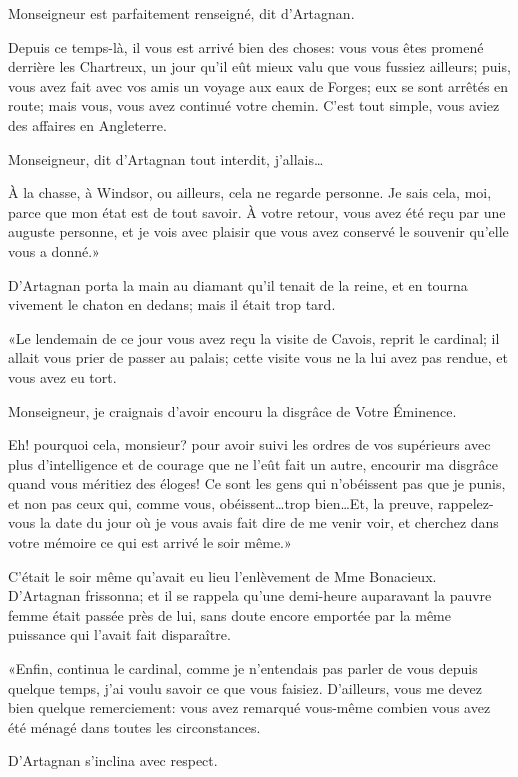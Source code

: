 \speak  Monseigneur est parfaitement renseigné, dit d'Artagnan. 

Depuis ce temps-là, il vous est arrivé bien des choses: vous vous êtes promené derrière les Chartreux, un jour qu'il eût mieux valu que vous fussiez ailleurs; puis, vous avez fait avec vos amis un voyage aux eaux de Forges; eux se sont arrêtés en route; mais vous, vous avez continué votre chemin. C'est tout simple, vous aviez des affaires en Angleterre. 

\speak  Monseigneur, dit d'Artagnan tout interdit, j'allais\dots 

\speak  À la chasse, à Windsor, ou ailleurs, cela ne regarde personne. Je sais cela, moi, parce que mon état est de tout savoir. À votre retour, vous avez été reçu par une auguste personne, et je vois avec plaisir que vous avez conservé le souvenir qu'elle vous a donné.» 

\speak  D'Artagnan porta la main au diamant qu'il tenait de la reine, et en tourna vivement le chaton en dedans; mais il était trop tard. 

«Le lendemain de ce jour vous avez reçu la visite de Cavois, reprit le cardinal; il allait vous prier de passer au palais; cette visite vous ne la lui avez pas rendue, et vous avez eu tort. 

\speak  Monseigneur, je craignais d'avoir encouru la disgrâce de Votre Éminence. 

\speak  Eh! pourquoi cela, monsieur? pour avoir suivi les ordres de vos supérieurs avec plus d'intelligence et de courage que ne l'eût fait un autre, encourir ma disgrâce quand vous méritiez des éloges! Ce sont les gens qui n'obéissent pas que je punis, et non pas ceux qui, comme vous, obéissent\dots trop bien\dots Et, la preuve, rappelez-vous la date du jour où je vous avais fait dire de me venir voir, et cherchez dans votre mémoire ce qui est arrivé le soir même.» 

C'était le soir même qu'avait eu lieu l'enlèvement de Mme Bonacieux. D'Artagnan frissonna; et il se rappela qu'une demi-heure auparavant la pauvre femme était passée près de lui, sans doute encore emportée par la même puissance qui l'avait fait disparaître. 

«Enfin, continua le cardinal, comme je n'entendais pas parler de vous depuis quelque temps, j'ai voulu savoir ce que vous faisiez. D'ailleurs, vous me devez bien quelque remerciement: vous avez remarqué vous-même combien vous avez été ménagé dans toutes les circonstances. 

D'Artagnan s'inclina avec respect. 

